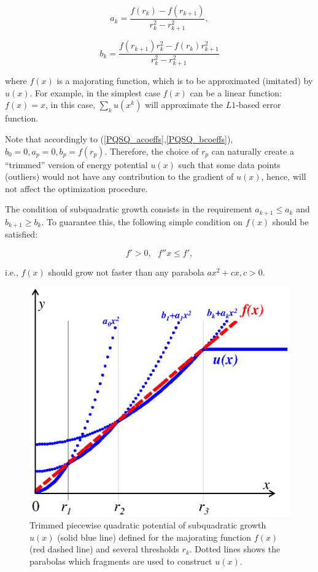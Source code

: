 \documentclass[preprint,12pt]{elsarticle}
\begin{document}
\begin{equation}\label{PQSQ_acoeffs}
a_k = \frac{f(r_k)-f(r_{k+1})}{r_k^2-r_{k+1}^2},
\end{equation}

\begin{equation}\label{PQSQ_bcoeffs}
b_k = \frac{f(r_{k+1})r_k^2-f(r_{k})r_{k+1}^2}{r_k^2-r_{k+1}^2}
\end{equation}

\noindent where $f(x)$ is a majorating function, which is to be approximated (imitated) by $u(x)$. For example, in the simplest case $f(x)$ can be a linear function: $f(x)=x$, in this case, $\sum_k u(x^k)$ will approximate the $L1$-based error function.

Note that accordingly to (\ref{PQSQ_acoeffs},\ref{PQSQ_bcoeffs}), $b_0=0, a_p=0, b_p=f(r_p)$. Therefore, the choice of $r_p$ can naturally create a ``trimmed'' version of energy potential $u(x)$ such that some data points (outliers) would not have any contribution to the gradient of $u(x)$, hence, will not affect the optimization procedure.

The condition of subquadratic growth consists in the requirement $a_{k+1}\leq a_{k}$ and $b_{k+1} \geq b_{k}$. To guarantee this, the following simple condition on $f(x)$ should be satisfied:

\begin{equation}
\label{eq:condition_function}
f'>0, \>\>\> f''x \leq f',
\end{equation}

\noindent i.e., $f(x)$ should grow not faster than any parabola $ax^2+cx, c>0$.

\begin{figure}[h]
\centering\includegraphics[width=0.6\linewidth]{potential.eps}
\caption{Trimmed piecewise quadratic potential of subquadratic growth $u(x)$ (solid blue line) defined for the majorating function $f(x)$ (red dashed line) and several thresholds $r_k$. Dotted lines shows the parabolas which fragments are used to construct $u(x)$.\label{potential}}
\end{figure}
\end{document}
